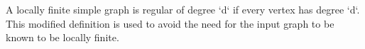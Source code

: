 


A locally finite simple graph is regular of degree `d` if every vertex has degree `d`.
This modified definition is used to avoid the need for the input graph to be known to be
locally finite.


